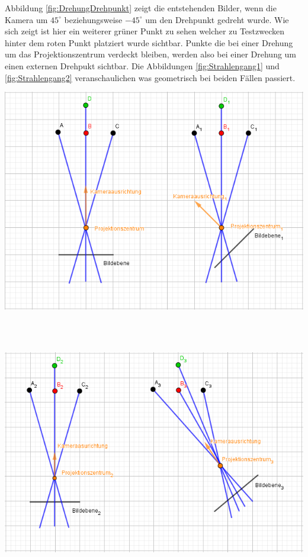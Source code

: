 Abbildung \ref{fig:DrehungDrehpunkt} zeigt die entstehenden Bilder, wenn die Kamera um \ensuremath{45^\circ} beziehungsweise \ensuremath{-45^\circ} um den Drehpunkt gedreht wurde. Wie sich zeigt ist hier ein weiterer grüner Punkt zu sehen welcher zu Testzwecken hinter dem roten Punkt platziert wurde sichtbar. Punkte die bei einer Drehung um das Projektionszentrum verdeckt bleiben, werden also bei einer Drehung um einen externen Drehpukt sichtbar. Die Abbildungen \ref{fig:Strahlengang1} und \ref{fig:Strahlengang2} veranschaulichen was geometrisch bei beiden Fällen passiert.\\

\begin{minipage}{\linewidth}
	\centering
	\includegraphics[width=.8\linewidth]{images/GrafikDrehungProjektionszentrum.png}
	\label{fig:Strahlengang1}
\end{minipage}\\ \\

\begin{minipage}{\linewidth}
	\centering
	\includegraphics[width=.8\linewidth]{images/GrafikDrehungUmDrehpunkt.png}
	\label{fig:Strahlengang2}
\end{minipage}\\ \\

